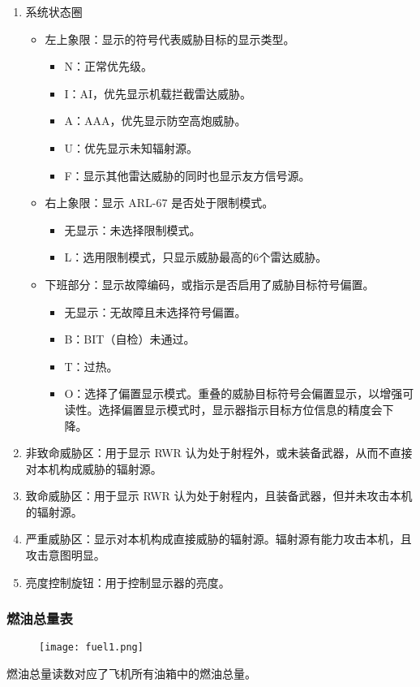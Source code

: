 \begin{enumerate}
  \item 系统状态圈
  \begin{itemize}
    \item 左上象限：显示的符号代表威胁目标的显示类型。
    \begin{itemize}
      \item N：正常优先级。
      \item I：AI，优先显示机载拦截雷达威胁。
      \item A：AAA，优先显示防空高炮威胁。
      \item U：优先显示未知辐射源。
      \item F：显示其他雷达威胁的同时也显示友方信号源。
    \end{itemize}
    \item 右上象限：显示 ARL-67 是否处于限制模式。
    \begin{itemize}
      \item 无显示：未选择限制模式。
      \item L：选用限制模式，只显示威胁最高的6个雷达威胁。
    \end{itemize}
    \item 下班部分：显示故障编码，或指示是否启用了威胁目标符号偏置。
    \begin{itemize}
      \item 无显示：无故障且未选择符号偏置。
      \item B：BIT（自检）未通过。
      \item T：过热。
      \item O：选择了偏置显示模式。重叠的威胁目标符号会偏置显示，以增强可读性。选择偏置显示模式时，显示器指示目标方位信息的精度会下降。
    \end{itemize}
  \end{itemize}
  \item 非致命威胁区：用于显示 RWR 认为处于射程外，或未装备武器，从而不直接对本机构成威胁的辐射源。
  \item 致命威胁区：用于显示 RWR 认为处于射程内，且装备武器，但并未攻击本机的辐射源。
  \item 严重威胁区：显示对本机构成直接威胁的辐射源。辐射源有能力攻击本机，且攻击意图明显。
  \item 亮度控制旋钮：用于控制显示器的亮度。
\end{enumerate}

\subsubsection{燃油总量表}
\begin{figure}[htb]
  \center
  \texttt{[image: fuel1.png]}
\end{figure}
燃油总量读数对应了飞机所有油箱中的燃油总量。

